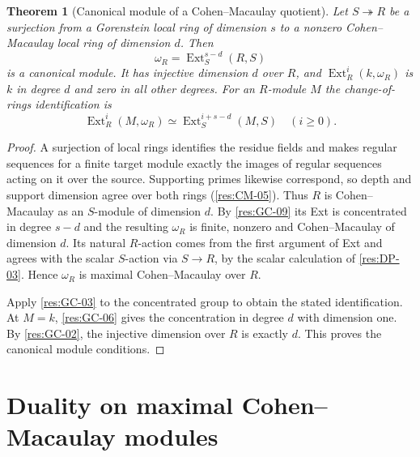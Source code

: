 \documentclass[11pt,oneside,openany]{book}
\newtheorem{theorem}{Theorem}[chapter]
\theoremstyle{definition}
\theoremstyle{remark}
\begin{document}
\begin{theorem}[Canonical module of a Cohen--Macaulay quotient]
\label{res:GC-10}
Let $S\twoheadrightarrow R$ be a surjection from a Gorenstein
local ring of dimension $s$ to a nonzero Cohen--Macaulay local
ring of dimension $d$. Then
\[
 \omega_R=\operatorname{Ext}^{s-d}_S(R,S)
\]
is a canonical module. It has injective dimension $d$ over $R$,
and $\operatorname{Ext}^i_R(k,\omega_R)$ is $k$ in degree $d$
and zero in all other degrees. For an $R$-module $M$ the
change-of-rings identification is
\[
 \operatorname{Ext}^i_R(M,\omega_R)
 \simeq\operatorname{Ext}^{i+s-d}_S(M,S)\quad(i\ge0).
\]
\end{theorem}
\begin{proof}
A surjection of local rings identifies the residue fields
and makes regular sequences for a finite target module
exactly the images of regular sequences acting on it
over the source. Supporting primes likewise correspond,
so depth and support dimension agree over both rings
(\ref{res:CM-05}). Thus $R$ is Cohen--Macaulay as an
$S$-module of dimension $d$. By \ref{res:GC-09} its Ext is
concentrated in degree $s-d$ and the resulting $\omega_R$
is finite, nonzero and Cohen--Macaulay of dimension $d$.
Its natural $R$-action comes from the first argument of
Ext and agrees with the scalar $S$-action via $S\to R$,
by the scalar calculation of \ref{res:DP-03}. Hence
$\omega_R$ is maximal Cohen--Macaulay over $R$.

Apply \ref{res:GC-03} to the concentrated group to obtain
the stated identification. At $M=k$, \ref{res:GC-06}
gives the concentration in degree $d$ with dimension one.
By \ref{res:GC-02}, the injective dimension over $R$ is
exactly $d$. This proves the canonical module conditions.
\end{proof}

\section{Duality on maximal Cohen--Macaulay modules}
\end{document}
